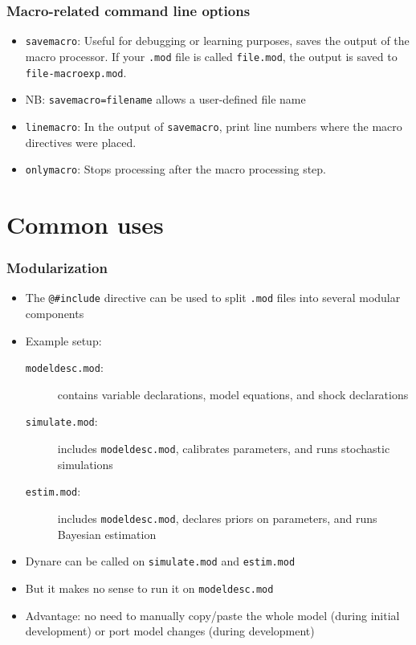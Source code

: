 \documentclass[aspectratio=169]{beamer}
\begin{document}
\begin{frame}
  \frametitle{Macro-related command line options}
  \begin{itemize}
  \item \texttt{savemacro}: Useful for debugging or learning purposes, saves the output of the macro processor. If your \texttt{.mod} file is called \texttt{file.mod}, the output is saved to \texttt{file-macroexp.mod}.
  \item NB: \texttt{savemacro=filename} allows a user-defined file name
  \item \texttt{linemacro}: In the output of \texttt{savemacro}, print line numbers where the macro directives were placed.
  \item \texttt{onlymacro}: Stops processing after the macro processing step.
  \end{itemize}
\end{frame}

\section{Common uses}

\begin{frame}[fragile=singleslide]
  \frametitle{Modularization}
  \begin{itemize}
  \item The \verb+@#include+ directive can be used to split \texttt{.mod} files into several modular components
  \item Example setup:
    \begin{description}
    \item[\texttt{modeldesc.mod}:] contains variable declarations, model equations, and shock declarations
    \item[\texttt{simulate.mod}:] includes \texttt{modeldesc.mod}, calibrates parameters, and runs stochastic simulations
    \item[\texttt{estim.mod}:] includes \texttt{modeldesc.mod}, declares priors on parameters, and runs Bayesian estimation
    \end{description}
  \item Dynare can be called on \texttt{simulate.mod} and \texttt{estim.mod}
  \item But it makes no sense to run it on \texttt{modeldesc.mod}
  \item Advantage: no need to manually copy/paste the whole model (during initial development) or port model changes (during development)
  \end{itemize}
\end{frame}
\end{document}

